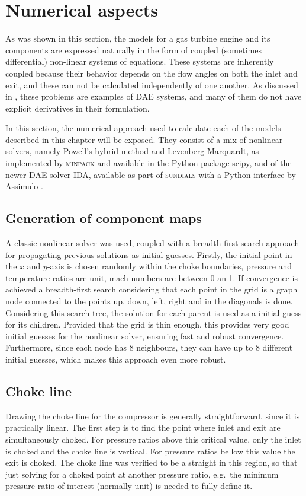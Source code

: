 \section{Numerical aspects}

As was shown in this section, the models for a gas turbine engine and its components are expressed naturally in the form of coupled (sometimes differential) non-linear systems of equations. 
These systems are inherently coupled because their behavior depends on the flow angles on both the inlet and exit, and these can not be calculated independently of one another.
As discussed in , these problems are examples of \ac{DAE} systems, and many of them do not have explicit derivatives in their formulation.

In this section, the numerical approach used to calculate each of the models described in this chapter will be exposed. They consist of a mix of nonlinear solvers, namely Powell's hybrid method and Levenberg-Marquardt, as implemented by \textsc{minpack} and available in the Python package scipy, and of the newer \ac{DAE} solver \textsc{IDA}, available as part of \textsc{sundials} \cite{sundials} with a Python interface by Assimulo \cite{assimulo}.

\subsection{Generation of component maps}
A classic nonlinear solver was used, coupled with a breadth-first search approach for propagating previous solutions as initial guesses. 
Firstly, the initial point in the $x$ and $y$-axis is chosen randomly within the choke boundaries, 
pressure and temperature ratios are unit, mach numbers are between 0 an 1. 
If convergence is achieved a breadth-first search considering that each point in the grid is a graph node connected to the points up, down, left, right and in the diagonals is done.
Considering this search tree, the solution for each parent is used as a initial guess for its children. Provided that the grid is thin enough, this provides very good initial guesses for the nonlinear solver, ensuring fast and robust convergence. Furthermore, since each node has 8 neighbours, they can have up to 8 different initial guesses, which makes this approach even more robust.

\subsection{Choke line}
Drawing the choke line for the compressor is generally straightforward, since it is practically linear. The first step is to find the point where inlet and exit are simultaneously choked. For pressure ratios above this critical value, only the inlet is choked and the choke line is vertical. For pressure ratios bellow this value the exit is choked. The choke line was verified to be a straight in this region, so that just solving for a choked point at another pressure ratio, e.g.\ the minimum pressure ratio of interest (normally unit) is needed to fully define it.


